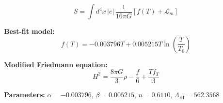 
\begin{equation}
  S = \int d^4x \, |e| \, \frac{1}{16\pi G} \left[ f(T) + \mathcal{L}_m \right]
\end{equation}

\textbf{Best-fit model:}
\begin{equation}
  f(T) = -0.003796 T + 0.005215 T \ln\!\left(\frac{T}{T_0}\right)
\end{equation}

\textbf{Modified Friedmann equation:}
\begin{equation}
  H^2 = \frac{8\pi G}{3} \rho - \frac{f}{6} + \frac{T f_T}{3}
\end{equation}

\textbf{Parameters:}
$\alpha = -0.003796$, \quad
$\beta = 0.005215$, \quad
$n = 0.6110$, \quad
$\Lambda_{\text{BI}} = 562.3568$